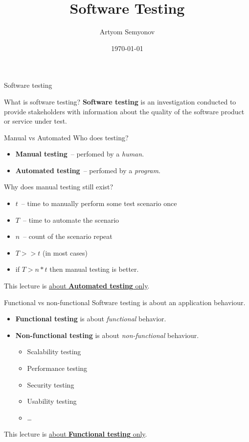 \documentclass[aspectratio=169]{beamer}
\title{Software Testing}
\author{Artyom Semyonov}
\institute{СПБгУ, СП}
\date{\today}
\begin{document}
\frame{\titlepage}

\begin{frame}{Software testing}
  \begin{block}{What is software testing?}
    \textbf{Software testing} is an investigation conducted to provide stakeholders
    with information about the quality of the software product or service under test.
  \end{block}
\end{frame}

\begin{frame}{Manual vs Automated}
  Who does testing?
  \begin{itemize}
    \item \textbf{Manual testing}~-- perfomed by a \textit{human}.
    \item \textbf{Automated testing}~-- perfomed by a \textit{program}.
  \end{itemize}
  \pause
  Why does manual testing still exist?
  \pause
  \begin{itemize}
    \item $t$~-- time to manually perform some test scenario once
    \item $T$~-- time to automate the scenario
    \item $n$~-- count of the scenario repeat
    \item $T >> t$ (in most cases)
    \item if $T > n * t$ then manual testing is better.
  \end{itemize}
  \bigskip
  \pause
  This lecture is \underline{about \textbf{Automated testing} only}.
\end{frame}

\begin{frame}{Functional vs non-functional}
  Software testing is about an application behaviour.
  \begin{itemize}
    \item \textbf{Functional testing} is about \textit{functional} behavior.
    \item \textbf{Non-functional testing} is about \textit{non-functional} behaviour.
      \begin{itemize}
        \item Scalability testing
        \item Performance testing
        \item Security testing
        \item Usability testing
        \item \ldots
      \end{itemize}
  \end{itemize}
  \bigskip
  \pause
  This lecture is \underline{about \textbf{Functional testing} only}.
\end{frame}
\end{document}

